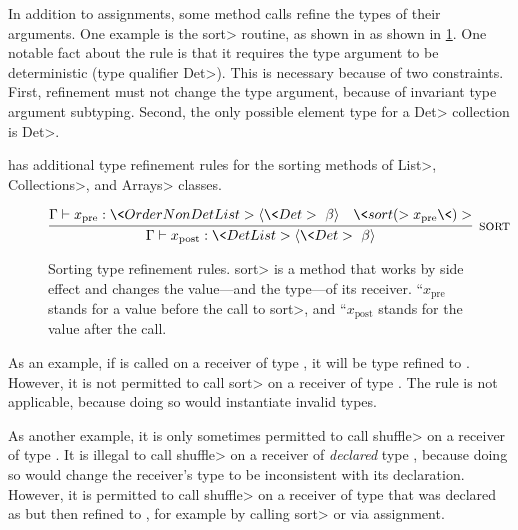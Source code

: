 In addition to assignments, some method calls refine the types of their
arguments.  One example is the \<sort> routine, as shown in 
as shown in \cref{fig-sorting}.  One notable fact about the 
rule is that it requires the type argument to be deterministic (type
qualifier \<Det>).  This is necessary because of two constraints.
First, refinement must not change the type argument, because of invariant
type argument subtyping.
Second, the only possible element type for a \<Det> collection is \<Det>.


\TheDeterminismChecker has additional type refinement rules for the sorting
methods of \<List>, \<Collections>, and \<Arrays> classes.
\begin{figure}
%     
    
  $\infer[\rulename{sort}]
  {\Gamma \vdash x_{\mathrm{post}} : \<Det List>\angles{\<Det>\ \beta}}
  {\Gamma \vdash x_{\mathrm{pre}} : \<OrderNonDet List>\angles{\<Det>\ \beta} & \<sort(>x_{\mathrm{pre}}\<)>}$
    
%     
    
    \caption{Sorting type refinement rules.  \<sort> is a method that works
      by side effect and changes the value---and the type---of its receiver.
    ``$x_{\mathrm{pre}}$ stands for a value before the call to \<sort>, and
      ``$x_{\mathrm{post}}$ stands for the value after the call.
    }
    \label{fig-sorting}
\end{figure}
As an example, if  is called on a receiver of type
, it will be type refined to
. However, it is not permitted to
call \<sort> on a receiver of type .  The rule is not applicable, because doing so would
instantiate invalid types.


As another example, it is only sometimes permitted to call \<shuffle> on a receiver of
type .  It is illegal to call \<shuffle> on a
receiver of \emph{declared} type , because doing so would change
the receiver's type to be inconsistent with its declaration.  However, it
is permitted to call \<shuffle> on a receiver of type  that was declared as  but then refined to , for example by
calling \<sort> or via assignment.




